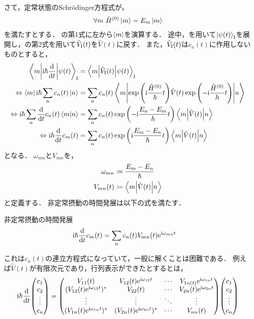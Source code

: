 \documentclass{report}
\begin{document}
  さて，定常状態のSchr\"odinger方程式が，
  \begin{align}
    \forall m\ \hat{H}^{(0)}\ket{m} = E_m\ket{m}
  \end{align}
  を満たすとする．
  の第1式に左から$\bra{m}$を演算する．
  途中，を用いて$\ket{\psi(t)}_{\mathrm{I}}$を展開し，の第2式を用いて$\hat{V}_{\mathrm{I}}(t)$を$\hat{V}(t)$に戻す．
  また，$\hat{V}_{\mathrm{I}}(t)$は$c_n(t)$に作用しないものとすると，
  \begin{align}
    \mel**{m}{\mathrm{i}\hbar\dv{t}}{\psi(t)}_{\mathrm{I}} &= \mel**{m}{\hat{V}_{\mathrm{I}}(t)}{\psi(t)}_{\mathrm{I}} \\ 
    \Leftrightarrow \bra{m}\mathrm{i}\hbar\sum_{n}c_n(t)\ket{n} &= \sum_{n}c_n(t)\mel**{m}{\exp\qty(\mathrm{i}\frac{\hat{H}^{(0)}}{\hbar}t)\hat{V}(t)\exp\qty(-\mathrm{i}\frac{\hat{H}^{(0)}}{\hbar}t)}{n} \\ 
    \Leftrightarrow \mathrm{i}\hbar\sum_{n}\dv{t}c_n(t)\braket{m}{n} &= \sum_{n}c_n(t)\exp\qty(-\mathrm{i}\frac{E_n - E_m}{\hbar}t)\mel**{m}{\hat{V}(t)}{n} \\ 
    \Leftrightarrow \mathrm{i}\hbar \dv{t}c_m(t) &= \sum_{n}c_n(t)\exp\qty(\mathrm{i}\frac{E_m - E_n}{\hbar}t)\mel**{m}{\hat{V}(t)}{n}
  \end{align}
  となる．
  $\omega_{mn}$と$V_{mn}$を，
  \begin{align}
    \omega_{mn} &\coloneqq \frac{E_m - E_n}{\hbar} \\ 
    V_{mn}(t) &\coloneqq \mel**{m}{\hat{V}(t)}{n}
  \end{align}
  と定義する．
  非定常摂動の時間発展は以下の式を満たす．
  \begin{itembox}[l]{非定常摂動の時間発展}
    \begin{align}
      \mathrm{i}\hbar\dv{t}c_m(t) &= \sum_{n}c_n(t)V_{mn}(t)\mathrm{e}^{\mathrm{i}\omega_{mn}t}\label{cnt-eq}
    \end{align}
  \end{itembox}
  これは$c_n(t)$の連立方程式になっていて，一般に解くことは困難である．
  例えば$\hat{V}(t)$が有限次元であり，行列表示ができたとするとは，
  \begin{align}
    \i\hbar\dv{t}\mqty(c_1 \\ c_2 \\ \vdots \\ c_n) 
    = \mqty(
      V_{11}(t) & V_{12}(t)\e^{\i\omega_{12}t} & \cdots & V_{1n(t)}\e^{\i\omega_{1n}t} \\ 
      (V_{12}(t)\e^{\i\omega_{12}t})^* & V_{22}(t) & \cdots & V_{2n}(t)\e^{\i\omega_{2n}t} \\ 
      \vdots & \vdots & \ddots & \vdots \\ 
      (V_{1n}(t)\e^{\i\omega_{1n}t})^* & (V_{2n}(t)\e^{\i\omega_{2n}t})^* & \cdots & V_{nn}(t)
      ) 
      \mqty(c_1 \\ c_2 \\ \vdots \\ c_n)\label{cnt-matrix}
  \end{align}
\end{document}
